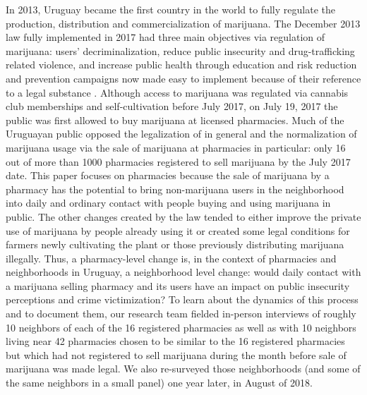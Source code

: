 \documentclass[11pt]{article}
\begin{document}
In 2013, Uruguay became the first country in the world to fully regulate the production, distribution and commercialization of marijuana. The December 2013 law fully implemented in 2017 had three main objectives via  regulation of marijuana:  users' decriminalization, reduce public insecurity and drug-trafficking related violence, and increase public health through education and risk reduction and prevention campaigns now made easy to implement because of their reference to a legal substance \citep{arraras2014inventando, pardo2014cannabis, queirolo2019uruguay}. Although access to marijuana was regulated via cannabis club memberships and self-cultivation before July 2017, on July 19, 2017 the public was first allowed to buy marijuana at licensed pharmacies. Much of the Uruguayan public opposed the legalization of in general and the normalization of marijuana usage via the sale of marijuana at pharmacies in particular: only 16 out of more than 1000 pharmacies registered to sell marijuana by the July 2017 date. This paper focuses on pharmacies because the sale of marijuana by a pharmacy has the potential to bring non-marijuana users in the neighborhood into daily and ordinary contact with people buying and using marijuana in public. The other changes created by the law tended to either improve the private use of marijuana by people already using it or created some legal conditions for farmers newly cultivating the plant or those previously distributing marijuana illegally. Thus, a pharmacy-level change is, in the context of pharmacies and neighborhoods in Uruguay, a neighborhood level change: would daily contact with a marijuana selling pharmacy and its users have an impact on public insecurity perceptions and crime victimization? To learn about the dynamics of this process and to document them, our research team fielded in-person interviews of roughly 10 neighbors of each of the 16 registered pharmacies as well as with 10 neighbors living near 42 pharmacies chosen to be similar to the 16 registered pharmacies but which had not registered to sell marijuana during the month before sale of marijuana was made legal. We also re-surveyed those neighborhoods (and some  of the same neighbors in a small panel) one year later, in August of 2018.
\end{document}
